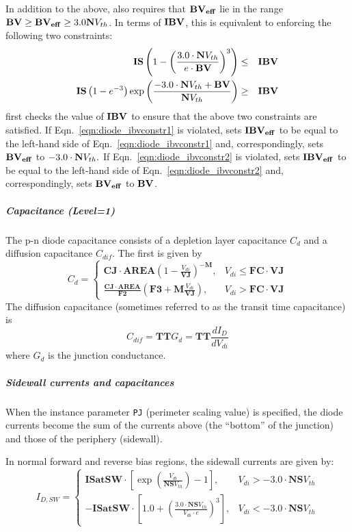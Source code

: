 In addition to the above, \Xyce{} also requires that $\mathbf{BV_{eff}}$ lie in the
range \mbox{$\mathbf{BV} \geq \mathbf{BV_{eff}} \geq 3.0\mathbf{N} V_{th}$.}  In terms of $\mathbf{IBV}   $,
this is equivalent to enforcing the following two constraints:
\begin{eqnarray}
\mathbf{IS}\left(1-\left(\frac{3.0\cdot\mathbf{N} V_{th}}{e\cdot\mathbf{BV}}\right)^3\right) & \leq & \mathbf{IBV} \label{eqn:diode_ibvconstr1}\\
\mathbf{IS}\left(1-e^{-3}\right)\exp\left(\frac{-3.0\cdot\mathbf{N} V_{th}+
\mathbf{BV}}{\mathbf{N} V_{th}}\right) & \geq & \mathbf{IBV} \label{eqn:diode_ibvconstr2}
\end{eqnarray}
\Xyce{} first checks the value of $\mathbf{IBV}$ to ensure that the above two
constraints are satisfied.  If Eqn.\ \ref{eqn:diode_ibvconstr1} is violated,
\Xyce{} sets $\mathbf{IBV_{eff}}$ to be equal to the left-hand side of Eqn.\
\ref{eqn:diode_ibvconstr1} and, correspondingly, sets $\mathbf{BV_{eff}}$ to $-3.0\cdot
\mathbf{N} V_{th}.$  If Eqn.\ \ref{eqn:diode_ibvconstr2} is violated, \Xyce{} sets
$\mathbf{IBV_{eff}}$ to be equal to the left-hand side of Eqn.\
\ref{eqn:diode_ibvconstr2} and, correspondingly, sets $\mathbf{BV_{eff}}$ to $\mathbf{BV}$.

\subparagraph{Capacitance (Level=1)}
The p-n diode capacitance consists of a depletion layer capacitance $C_d$ and a
diffusion capacitance $C_{dif}$.  The first is given by
\[
C_d = \left\{ \begin{array}{ll}
\mathbf{CJ}\cdot\mathbf{AREA} \left(1-\frac{V_{di}}{\mathbf{VJ}} \right)^{-\mathbf{M}}, &
V_{di} \leq \mathbf{FC \cdot VJ} \\
\frac{\mathbf{CJ}\cdot\mathbf{AREA}}{\mathbf{F2}}\left(\mathbf{F3}+\mathbf{M}\frac{V_{di}}{\mathbf{VJ}}\right),
& V_{di} > \mathbf{FC \cdot VJ}
\end{array}
\right.
\]
The diffusion capacitance (sometimes referred to as the transit time
capacitance) is
\[
C_{dif} = \mathbf{TT}G_d = \mathbf{TT}\frac{dI_D}{dV_{di}}
\]
where $G_d$ is the junction conductance.

\subparagraph{Sidewall currents and capacitances}
When the instance parameter \texttt{PJ} (perimeter scaling value) is
specified, the diode currents become the sum of the currents above
(the ``bottom'' of the junction) and those of the periphery (sidewall).

In normal forward and reverse bias regions, the sidewall currents are given by:
$$
I_{D,SW} = \left\{ \begin{array}{ll}
\mathbf{ISatSW}\cdot\left[\exp \left(\frac{V_{di}}{\mathbf{NS}V_{th}}\right) - 1
\right], & V_{di} > -3.0\cdot\mathbf{NS}V_{th} \\
-\mathbf{ISatSW}\cdot\left[1.0 + \left(\frac{3.0\cdot\mathbf{NS}V_{th}}{V_{di}\cdot
e}\right)^3\right], & V_{di} < -3.0\cdot\mathbf{NS}V_{th}
\end{array}
\right.
$$

